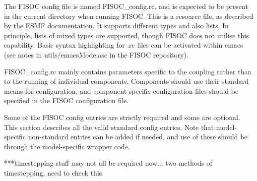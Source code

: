 \documentclass[12pt]{article}
\begin{document}
The FISOC config file is named FISOC\_config.rc, and is expected to be present 
in the current directory when running FISOC.  
This is a resource file, as described by the 
ESMF documentation.  It supports different types and also lists. 
In principle, lists of mixed types are supported, though FISOC does not utilise this capability.
Basic syntax highlighting for .rc files can be activated within emacs 
(see notes in utils/emacsMode.asc in the FISOC repository).

FISOC\_config.rc mainly contains parameters specific to the coupling rather than to the running of 
individual components.  
Components should use their standard means for configuration, and component-specific configuration files 
should be specified in the FISOC configuration file.

Some of the FISOC config entries are strictly required and some are optional.
This section describes all the valid standard config entries. 
Note that model-specific non-standard entries can be added if needed, and use of these 
should be through the model-specific wrapper code.

***timestepping stuff may not all be required now... two methods of timestepping, need to check this.
\end{document}
